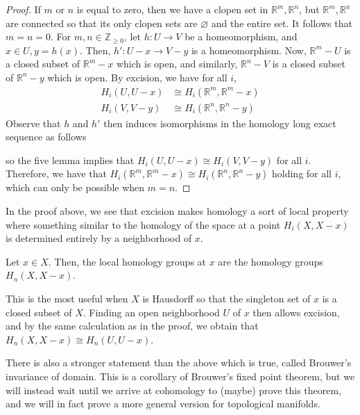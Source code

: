 \documentclass[12pt,reqno]{amsart}
\numberwithin{theorem}{section}
\theoremstyle{definition}
\theoremstyle{remark}
\numberwithin{equation}{section}
\newcommand{\Z}{\mathbb Z}
\theoremstyle{definition}
\newcommand{\R}{\mathbb{R}}
\begin{document}
\begin{proof}
    If $m$ or $n$ is equal to zero, then we have a clopen set in $\R^m,\R^n$, but $\R^m,\R^n$ are connected so that its only clopen sets are $\varnothing$ and the entire set. It follows that $m=n=0$. For $m,n \in \Z_{\geq 0}$, let $h:U\rightarrow V$ be a homeomorphism, and $x \in U, y =h(x)$. Then, $h': U-x\rightarrow V-y$ is a homeomorphism. Now, $\R^m-U$ is a closed subset of $\R^m-x$ which is open, and similarly, $\R^n-V$ is a closed subset of $\R^n-y$ which is open. By excision, we have for all $i$,
    \begin{align*}
        H_i(U,U-x) &\cong H_i(\R^m,\R^m-x) \\
        H_i(V,V-y) &\cong H_i(\R^n,\R^n-y)
    \end{align*}
    Observe that $h$ and $h'$ then induces isomorphisms in the homology long exact sequence as follows
\begin{center}
\end{center}
    so the five lemma implies that $H_i(U,U-x) \cong H_i(V,V-y)$ for all $i$. Therefore, we have that $H_i(\R^{m},\R^{m}-x) \cong H_i(\R^{n},\R^n-y)$ holding for all $i$, which can only be possible when $m=n$.
\end{proof}
In the proof above, we see that excision makes homology a sort of local property where something similar to the homology of the space at a point $H_i(X,X-x)$ is determined entirely by a neighborhood of $x$. 
\begin{definition}
    Let $x \in X$. Then, the local homology groups at $x$ are the homology groups $H_n(X,X-x)$.
\end{definition}
This is the most useful when $X$ is Hausdorff so that the singleton set of $x$ is a closed subset of $X$. Finding an open neighborhood $U$ of $x$ then allows excision, and by the same calculation as in the proof, we obtain that $H_n(X,X-x) \cong H_n(U,U-x)$. 

There is also a stronger statement than the above which is true, called Brouwer's invariance of domain. This is a corollary of Brouwer's fixed point theorem, but we will instead wait until we arrive at cohomology to (maybe) prove this theorem, and we will in fact prove a more general version for topological manifolds.
\end{document}
